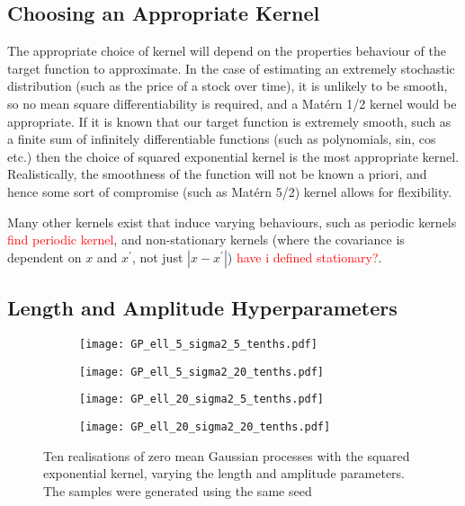 \subsection*{Choosing an Appropriate Kernel}

The appropriate choice of kernel will depend on the properties behaviour of the
target function to approximate. In the case of estimating an extremely
stochastic distribution (such as the price of a stock over time), it is
unlikely to be smooth, so no mean square differentiability is required, and a
Mat\'ern 1/2 kernel would be appropriate. If it is known that our target
function is extremely smooth, such as a finite sum of infinitely differentiable
functions (such as polynomials, sin, cos etc.) then the choice of squared
exponential kernel is the most appropriate kernel. Realistically, the
smoothness of the function will not be known a priori, and hence some sort of
compromise (such as Mat\'ern 5/2) kernel allows for flexibility.

Many other kernels exist that induce varying behaviours, such as periodic
kernels \textcolor{red}{find periodic kernel}, and non-stationary kernels
(where the covariance is dependent on $x$ and $x^\prime$, not just
$|x - x^\prime|$)
\textcolor{red}{have i defined stationary?}.

\subsection*{Length and Amplitude Hyperparameters}

\begin{figure}[htbp]
    \centering
    \begin{subfigure}[b]{0.5\textwidth}
        \centering
        \texttt{[image: GP\_ell\_5\_sigma2\_5\_tenths.pdf]}
        \label{fig:half_half}
    \end{subfigure}%
    \hfill%
    \begin{subfigure}[b]{0.5\textwidth}
        \centering
        \texttt{[image: GP\_ell\_5\_sigma2\_20\_tenths.pdf]}
        \label{fig:half_two}
    \end{subfigure}
    \begin{subfigure}[b]{0.5\textwidth}
        \centering
        \texttt{[image: GP\_ell\_20\_sigma2\_5\_tenths.pdf]}
        \label{fig:two_half}
    \end{subfigure}%
    \hfill%
    \begin{subfigure}[b]{0.5\textwidth}
        \centering
        \texttt{[image: GP\_ell\_20\_sigma2\_20\_tenths.pdf]}
        \label{fig:two_two}
    \end{subfigure}%
    \caption{
        Ten realisations of zero mean Gaussian processes with the squared
        exponential kernel, varying the length and amplitude parameters.
        The samples were generated using the same seed
    }
    \label{fig:length_amp}
\end{figure}

